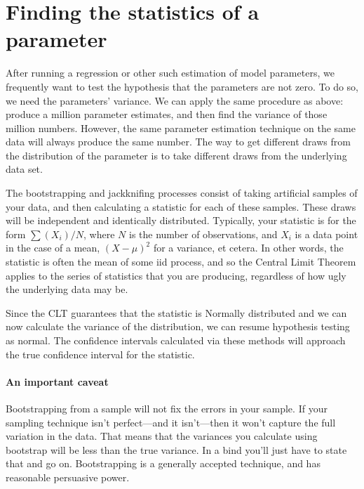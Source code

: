 
\section{Finding the statistics of a parameter}
After running a regression or other such estimation of model parameters,
we frequently want to test the hypothesis that the parameters are not
zero. To do so, we need the parameters' variance.
We can apply the same procedure as above: produce a million parameter
estimates, and then find the variance of those million numbers. However,
the same parameter estimation technique on the same data will always
produce the same number. The way to get different draws from the
distribution of the parameter is to take different draws from the
underlying data set.

The bootstrapping and jackknifing processes consist of taking artificial
samples of your data, and then calculating a statistic for each of these
samples. These draws will be independent and identically distributed.
Typically, your statistic is for the form $\sum (X_i)/ N$, where  $N$
is the number of observations, and $X_i$ is a data point in the case
of a mean, $(X-\mu)^2$ for a variance, et cetera. In other words, the
statistic is often the mean of some iid process, and so the Central
Limit Theorem applies to the series of statistics that you are
producing, regardless of how ugly the underlying data may be.

Since the CLT guarantees that the  statistic is Normally distributed
and we can now calculate the variance of the distribution, we can resume
hypothesis testing as normal. The confidence intervals calculated via these
methods will approach the true confidence interval for the statistic.

\paragraph{An important caveat} Bootstrapping from a sample will not fix
the errors in your sample. If your sampling technique isn't perfect---and
it isn't---then it won't capture the full variation in the data. That
means that the variances you calculate using bootstrap will be less than
the true variance. In a bind you'll just have
to state that and go on. Bootstrapping is a generally accepted technique,
and has reasonable persuasive power.

